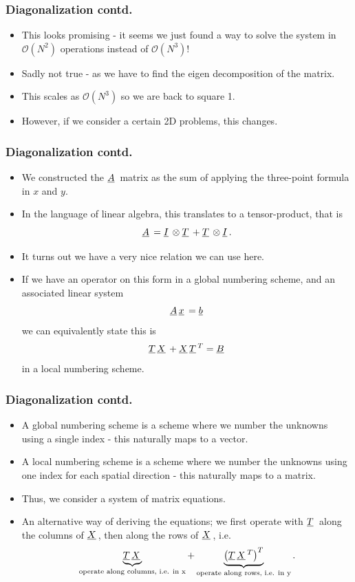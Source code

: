 \documentclass{beamer}
\newcommand{\ub}[1]{\underbar{$#1$}\,}
\begin{document}
\begin{frame}\frametitle{Diagonalization contd.}
  \begin{itemize}
    \item This looks promising - it seems we just found a way to solve the system in
      $\mathcal{O}\left(N^2\right)$ operations instead of $\mathcal{O}\left(N^3\right)$!
    \item Sadly not true - as we have to find the eigen decomposition of the matrix.
    \item This scales as $\mathcal{O}\left(N^3\right)$ so we are back to square 1.
    \item However, if we consider a certain 2D problems, this changes.
  \end{itemize}
\end{frame}
\begin{frame}\frametitle{Diagonalization contd.}
  \begin{itemize}
    \item We constructed the $\ub{A}$ matrix as the sum of applying the three-point
      formula in $x$ and $y$.
    \item In the language of linear algebra, this translates to a tensor-product, that is
      \[
        \ub{A} = \ub{I}\otimes\ub{T} + \ub{T}\otimes\ub{I}.
      \]
    \item It turns out we have a very nice relation we can use here.
    \item If we have an operator on this form in a global numbering scheme, and
      an associated linear system
      \[
        \ub{A}\ub{x} = \ub{b}
      \]
      we can equivalently state this is
      \[
        \ub{T}\ub{X} + \ub{X}\ub{T}^T = \ub{B}
      \]
      in a local numbering scheme.
  \end{itemize}
\end{frame}
\begin{frame}\frametitle{Diagonalization contd.}
  \begin{itemize}
    \item A global numbering scheme is a scheme where we number the unknowns using a single index
      - this naturally maps to a vector.
    \item A local numbering scheme is a scheme where we number the unknowns using one index for each spatial direction
      - this naturally maps to a matrix.
    \item Thus, we consider a system of matrix equations.
    \item An alternative way of deriving the equations; we first operate with $\ub{T}$
      along the columns of $\ub{X}$, then along the rows of $\ub{X}$, i.e.
      \[
        \underbrace{\ub{T}\ub{X}}_{\text{operate along columns, i.e. in x}} + \underbrace{\left(\ub{T}\ub{X}^T\right)^T}_{\text{operate along rows, i.e. in y}}.
      \]
  \end{itemize}
\end{frame}
\end{document}

